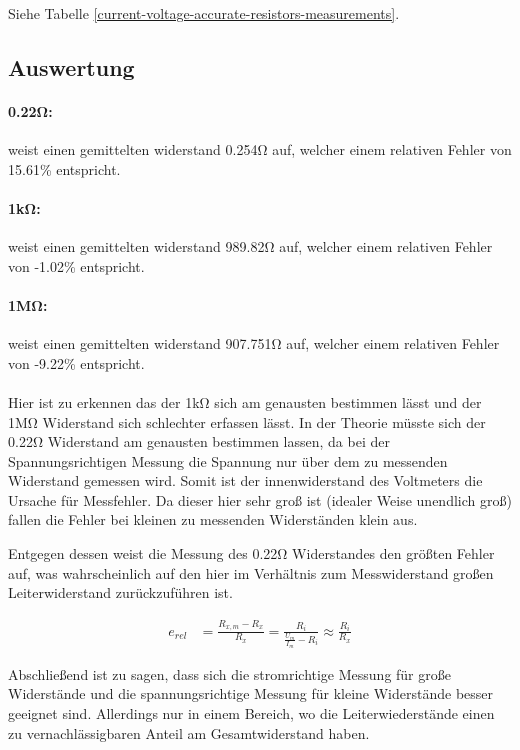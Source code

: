 Siehe Tabelle \ref{current-voltage-accurate-resistors-measurements}.

\subsection{Auswertung}

\paragraph{0.22\si{\ohm}:}
weist einen gemittelten widerstand 0.254\si{\ohm} auf, welcher einem relativen Fehler von 15.61\% entspricht.

\paragraph{1\si{\kilo\ohm}:}
weist einen gemittelten widerstand 989.82\si{\ohm} auf, welcher einem relativen Fehler von -1.02\% entspricht.

\paragraph{1\si{\mega\ohm}:}
weist einen gemittelten widerstand 907.751\si{\ohm} auf, welcher einem relativen Fehler von -9.22\% entspricht.

\paragraph{}
Hier ist zu erkennen das der 1\si{\kilo\ohm} sich am genausten bestimmen lässt und der 1\si{\mega\ohm} Widerstand sich schlechter erfassen lässt. In der Theorie müsste sich der 0.22\si{\ohm} Widerstand am genausten bestimmen lassen, da bei der Spannungsrichtigen Messung die Spannung nur über dem zu messenden Widerstand gemessen wird. Somit ist der innenwiderstand des Voltmeters die Ursache für Messfehler. Da dieser hier sehr groß ist (idealer Weise unendlich groß) fallen die Fehler bei kleinen zu messenden Widerständen klein aus.

Entgegen dessen weist die Messung des 0.22\si{\ohm} Widerstandes den größten Fehler auf, was wahrscheinlich auf den hier im Verhältnis zum Messwiderstand großen Leiterwiderstand zurückzuführen ist.

\begin{align}
    e_{rel} &= \frac{R_{x,m} - R_x}{R_x} = \frac{R_i}{\frac{U_m}{I_m} - R_i} \approx \frac{R_i}{R_x}
\end{align}

Abschließend ist zu sagen, dass sich die stromrichtige Messung für große Widerstände und die spannungsrichtige Messung für kleine Widerstände besser geeignet sind. Allerdings nur in einem Bereich, wo die Leiterwiederstände einen zu vernachlässigbaren Anteil am Gesamtwiderstand haben.
